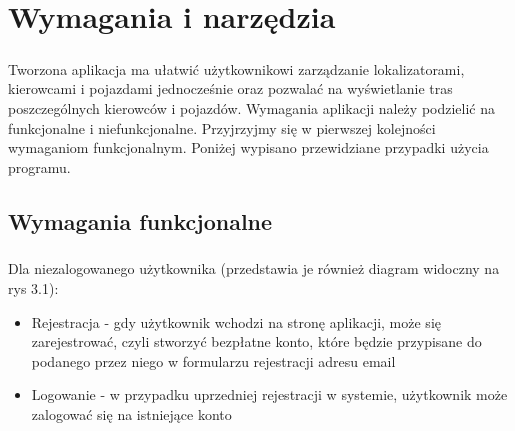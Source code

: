 \chapter{Wymagania i narzędzia}
\label{ch:wymagania-i-narzedzia}

\paragraph{}
Tworzona aplikacja ma ułatwić użytkownikowi zarządzanie lokalizatorami, kierowcami i pojazdami jednocześnie oraz pozwalać na wyświetlanie tras poszczególnych kierowców i pojazdów. Wymagania aplikacji należy podzielić na funkcjonalne i niefunkcjonalne. Przyjrzyjmy się w pierwszej kolejności wymaganiom funkcjonalnym. Poniżej wypisano przewidziane przypadki użycia programu.

\section{Wymagania funkcjonalne}
\paragraph{}
Dla niezalogowanego użytkownika (przedstawia je również diagram widoczny na rys 3.1):

\begin{itemize}
\item Rejestracja - gdy użytkownik wchodzi na stronę aplikacji, może się zarejestrować, czyli stworzyć bezpłatne konto, które będzie przypisane do podanego przez niego w formularzu rejestracji adresu email
\item Logowanie - w przypadku uprzedniej rejestracji w systemie, użytkownik może zalogować się na istniejące konto
\end{itemize}

